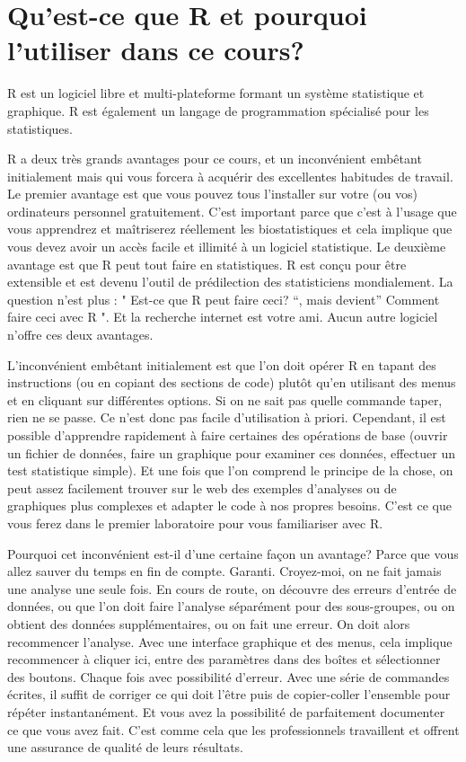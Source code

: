 \documentclass[
  12pt,
]{book}
\begin{document}
\hypertarget{quest-ce-que-r-et-pourquoi-lutiliser-dans-ce-cours}{%
\section*{Qu'est-ce que R et pourquoi l'utiliser dans ce cours?}\label{quest-ce-que-r-et-pourquoi-lutiliser-dans-ce-cours}}

R est un logiciel libre et multi-plateforme formant un système statistique et graphique.
R est également un langage de programmation spécialisé pour les statistiques.

R a deux très grands avantages pour ce cours, et un inconvénient embêtant initialement mais qui vous forcera à acquérir des excellentes habitudes de travail.
Le premier avantage est que vous pouvez tous l'installer sur votre (ou vos) ordinateurs personnel gratuitement.
C'est important parce que c'est à l'usage que vous apprendrez et maîtriserez réellement les biostatistiques et cela implique que vous devez avoir un accès facile et illimité à un logiciel statistique.
Le deuxième avantage est que R peut tout faire en statistiques.
R est conçu pour être extensible et est devenu l'outil de prédilection des statisticiens mondialement.
La question n'est plus : " Est-ce que R peut faire ceci? ``, mais devient'' Comment faire ceci avec R ".
Et la recherche internet est votre ami.
Aucun autre logiciel n'offre ces deux avantages.

L'inconvénient embêtant initialement est que l'on doit opérer R en tapant des instructions (ou en copiant des sections de code) plutôt qu'en utilisant des menus et en cliquant sur différentes options.
Si on ne sait pas quelle commande taper, rien ne se passe.
Ce n'est donc pas facile d'utilisation à priori.
Cependant, il est possible d'apprendre rapidement à faire certaines des opérations de base (ouvrir un fichier de données, faire un graphique pour examiner ces données, effectuer un test statistique simple).
Et une fois que l'on comprend le principe de la chose, on peut assez facilement trouver sur le web des exemples d'analyses ou de graphiques plus complexes et adapter le code à nos propres besoins.
C'est ce que vous ferez dans le premier laboratoire pour vous familiariser avec R.

Pourquoi cet inconvénient est-il d'une certaine façon un avantage? Parce que vous allez sauver du temps en fin de compte.
Garanti.
Croyez-moi, on ne fait jamais une analyse une seule fois.
En cours de route, on découvre des erreurs d'entrée de données, ou que l'on doit faire l'analyse séparément pour des sous-groupes, ou on obtient des données supplémentaires, ou on fait une erreur.
On doit alors recommencer l'analyse.
Avec une interface graphique et des menus, cela implique recommencer à cliquer ici, entre des paramètres dans des boîtes et sélectionner des boutons.
Chaque fois avec possibilité d'erreur.
Avec une série de commandes écrites, il suffit de corriger ce qui doit l'être puis de copier-coller l'ensemble pour répéter instantanément.
Et vous avez la possibilité de parfaitement documenter ce que vous avez fait.
C'est comme cela que les professionnels travaillent et offrent une assurance de qualité de leurs résultats.
\end{document}

